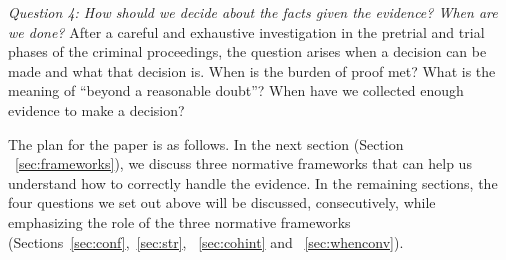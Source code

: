 \documentclass[10pt]{article}
\begin{document}

\textit{Question 4:	How should we decide about the facts given the evidence? When are we done?}
After a careful and exhaustive investigation in the pretrial and trial phases of the criminal proceedings, the question arises when a decision can be made and what that decision is. When is the burden of proof met? What is the meaning of ``beyond a reasonable doubt''? When have we collected enough evidence to make a decision?

\vspace{1em}
\noindent
The plan for the paper is as follows. In the next section  (Section ~\ref{sec:frameworks}), we discuss three normative frameworks 
that can help us understand how to correctly handle the evidence. %
In the remaining sections, the four questions we set out above will be discussed, consecutively, while emphasizing 
the role of the three normative frameworks (Sections~\ref{sec:conf},~\ref{sec:str}, ~\ref{sec:cohint} and ~\ref{sec:whenconv}). 
\end{document}
